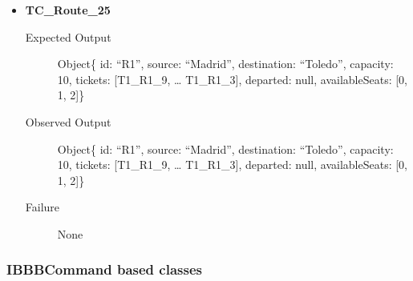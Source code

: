 \documentclass[11pt]{article}
\begin{document}
\begin{itemize}
\item \textbf{TC\_Route\_25}
\begin{description}
\item[{Expected Output}] Object\{ id: “R1”, source: “Madrid”, destination: “Toledo”, capacity: 10,  tickets: [T1\_R1\_9, … T1\_R1\_3], departed: null, availableSeats: [0, 1, 2]\}
\item[{Observed Output}] Object\{ id: “R1”, source: “Madrid”, destination: “Toledo”, capacity: 10,  tickets: [T1\_R1\_9, … T1\_R1\_3], departed: null, availableSeats: [0, 1, 2]\}
\item[{Failure}] None
\end{description}
\end{itemize}

\subsubsection{IBBBCommand based classes}
\label{sec:org900e541}
\end{document}
